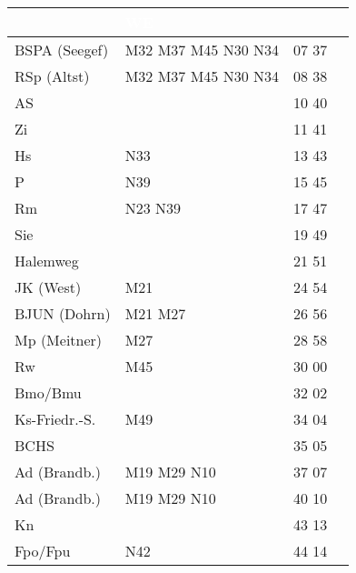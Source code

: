 \begin{tabular}{!{\color{schiefergrau}\vrule width 3pt}*{4}{l!{\color{schiefergrau}\vrule width 3pt}}}
\hline
{}
 & \textcolor{white}{\bfseries WE} \\
\hline
BSPA (Seegef)& \mbus{} M32 M37 M45 \nbus{} N30 N34         & 07 37 &       \\
RSp (Altst)  & \mbus{} M32 M37 M45 \nbus{} N30 N34         & 08 38 &       \\
AS           &                                             & 10 40 &       \\
Zi           &                                             & 11 41 &       \\
Hs           & \nbus{} N33                                 & 13 43 &       \\
P            & \nbus{} N39                                 & 15 45 &       \\
Rm           & \nbus{} N23 N39                             & 17 47 &       \\
Sie          &                                             & 19 49 &       \\
Halemweg     &                                             & 21 51 &       \\
JK (West)    & \mbus{} M21                                 & 24 54 &       \\
BJUN (Dohrn) & \mbus{} M21 M27                             & 26 56 &       \\
Mp (Meitner) & \mbus{} M27                                 & 28 58 &       \\
Rw           & \mbus{} M45                                 & 30 00 &       \\
Bmo/Bmu      & \nuzwei{}                                   & 32 02 &       \\
Ks-Friedr.-S.& \mbus{} M49                                 & 34 04 &       \\
BCHS         &                                             & 35 05 &       \\
Ad (Brandb.) & \mbus{} M19 M29 \nbus{} N10                 & 37 07 &       \\
\hline
Ad (Brandb.) & \mbus{} M19 M29 \nbus{} N10                 & 40 10 &       \\
Kn           &                                             & 43 13 &       \\
Fpo/Fpu      & \nudrei{} \nbus{} N42                       & 44 14 &       \\

\end{tabular}
